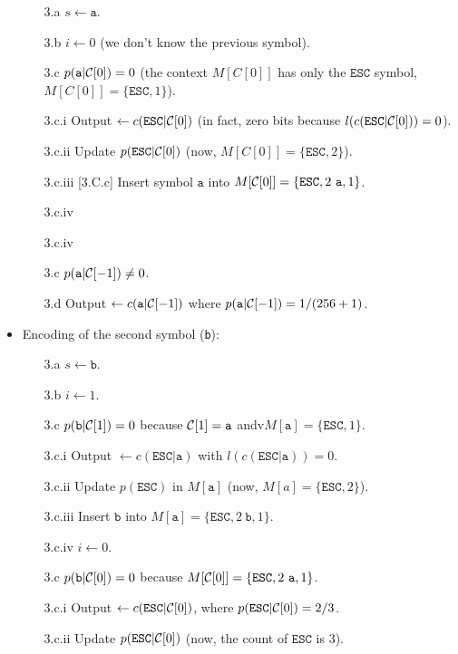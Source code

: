 \begin{itemize}
  \begin{enumerate}
  \item [3.a] $s\leftarrow \mathtt{a}$.
  \item [3.b] $i\leftarrow 0$ (we don't know the previous symbol).
  \item [3.c] $p(\mathtt{a}|{\cal C}[0])=0$ (the context $M[C[0]]$ has only the $\mathtt{ESC}$ symbol, $M[C[0]]=\{\mathtt{ESC},1\}$).
  \item [3.c.i] Output $\leftarrow c(\mathtt{ESC}|{\cal C}[0])$ (in fact, zero bits because 
      $l(c(\mathtt{ESC}|{\cal C}[0]))=0$).
  \item [3.c.ii] Update $p(\mathtt{ESC}|{\cal C}[0])$ (now, $M[C[0]]=\{\mathtt{ESC},2\}$).
  \item [3.c.iii] [3.C.c] Insert symbol $\mathtt{a}$ into
    $M[{\cal C}[0]]=\{\mathtt{ESC},2~\mathtt{a},1\}$.
  \item [3.c.iv] \item [3.c.iv]
  \item [3.c]  $p(\mathtt{a}|{\cal C}[-1])\neq 0$.
  \item [3.d] Output $\leftarrow c(\mathtt{a}|{\cal C}[-1])$ where
    $p(\mathtt{a}|{\cal C}[-1]) = 1/(256+1)$.
  \end{enumerate}
  \item Encoding of the second symbol (\texttt{b}):
  \begin{enumerate}
  \item [3.a] $s\leftarrow \mathtt{b}$.
  \item [3.b] $i\leftarrow 1$.
  \item [3.c] $p(\mathtt{b}|{\cal C}[1])=0$ because ${\cal C}[1]=\mathtt{a}$ andv$M[\mathtt{a}]=\{\mathtt{ESC},1\}$.
  \item [3.c.i] Output $\leftarrow c(\mathtt{ESC}|\mathtt{a})$ with $l(c(\mathtt{ESC}|\mathtt{a}))=0$.
  \item [3.c.ii] Update $p(\mathtt{ESC})$ in $M[\mathtt{a}]$ (now, $M[a]=\{\mathtt{ESC},2\}$).
  \item [3.c.iii] Insert $\mathtt{b}$ into $M[\mathtt{a}]=\{\mathtt{ESC},2~ \mathtt{b},1\}$.
  \item [3.c.iv] $i\leftarrow 0$.
  \item [3.c] $p(\mathtt{b}|{\cal C}[0])=0$ because $M[{\cal C}[0]]=\{\mathtt{ESC},2~\texttt{a},1\}$.
  \item [3.c.i] Output $\leftarrow c(\mathtt{ESC}|{\cal C}[0])$, where $p(\mathtt{ESC}|{\cal C}[0]) = 2/3$.
  \item [3.c.ii] Update $p(\mathtt{ESC}|{\cal C}[0])$ (now, the count of $\mathtt{ESC}$ is $3$).

\end{enumerate}
\end{itemize}
